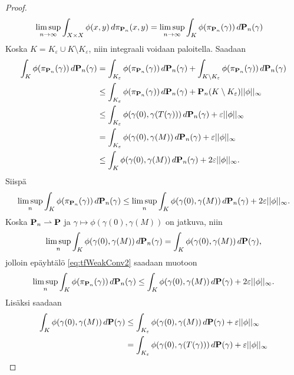 \begin{proof}
\begin{align*}
        \limsup_{n\to\infty} \int_{X \times X} \phi(x, y) \, d\pi_{\P_n} (x, y) &= \limsup_{n\to\infty} \int_{K} \phi(\pi_{\P_n}(\gamma)) \, d\P_n (\gamma)  
    \end{align*}
    Koska $K = K_\varepsilon \cup K \setminus K_\varepsilon$, niin integraali voidaan paloitella. Saadaan
    \begin{align*}
        \int_{K} \phi(\pi_{\P_n}(\gamma)) \, d\P_n (\gamma) &= \int_{K_\varepsilon} \phi(\pi_{\P_n}(\gamma)) \, d\P_n (\gamma) + \int_{K \setminus K_\varepsilon} \phi(\pi_{\P_n}(\gamma)) \, d\P_n (\gamma) \\
        &\le \int_{K_\varepsilon} \phi(\pi_{\P_n}(\gamma)) \, d\P_n (\gamma) + \P_n(K\setminus K_\varepsilon) ||\phi||_\infty\\
        &\le \int_{K_\varepsilon} \phi(\gamma(0),\gamma(T(\gamma))) \, d\P_n (\gamma) + \varepsilon||\phi||_\infty \\
        &=  \int_{K_\varepsilon} \phi(\gamma(0),\gamma(M)) \, d\P_n (\gamma) + \varepsilon||\phi||_\infty \\
        &\le \int_{K} \phi(\gamma(0),\gamma(M)) \, d\P_n (\gamma) + 2\varepsilon||\phi||_\infty.
    \end{align*}
Siispä 
    \begin{align} \label{eq:tfWeakConv2}
        \limsup_{n} \int_{K} \phi(\pi_{\P_n}(\gamma)) \, d\P_n (\gamma) \le \limsup_n \int_{K} \phi(\gamma(0),\gamma(M)) \, d\P_n (\gamma) + 2\varepsilon||\phi||_\infty.
    \end{align}
Koska $\P_n \rightharpoonup \P$ ja $\gamma \mapsto \phi(\gamma(0), \gamma(M))$ on jatkuva, niin 
    \begin{equation*}
        \limsup_n \int_{K} \phi(\gamma(0),\gamma(M)) \, d\P_n (\gamma) = \int_{K} \phi(\gamma(0),\gamma(M)) \, d\P (\gamma),
    \end{equation*}
jolloin epäyhtälö \eqref{eq:tfWeakConv2} saadaan muotoon
    \begin{align*}
        \limsup_{n} \int_{K} \phi(\pi_{\P_n}(\gamma)) \, d\P_n (\gamma) \le \int_{K} \phi(\gamma(0),\gamma(M)) \, d\P (\gamma) + 2\varepsilon||\phi||_\infty.
    \end{align*}
Lisäksi saadaan
    \begin{align*}
        \int_K \phi(\gamma(0),\gamma(M)) \, d\P (\gamma) &\le \int_{K_\varepsilon} \phi(\gamma(0),\gamma(M)) \, d\P (\gamma) + \varepsilon||\phi||_\infty \\
        &=\int_{K_\varepsilon} \phi(\gamma(0),\gamma(T(\gamma))) \, d\P (\gamma) + \varepsilon||\phi||_\infty \\

\end{align*}
\end{proof}
